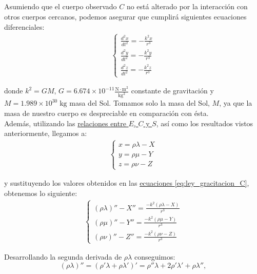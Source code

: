 \documentclass[11pt]{article}
\begin{document}
\subsection{}
Asumiendo que el cuerpo observado $C$ no está alterado por la interacción con otros cuerpos cercanos, podemos asegurar que cumplirá siguientes ecuaciones diferenciales:
\begin{align}
\left\{
\begin{array}{l}
	\frac{d^2x}{dt^2}=-\frac{k^2x}{r^3}\\
	\frac{d^2y}{dt^2}=-\frac{k^2y}{r^3}\\
	\frac{d^2z}{dt^2}=-\frac{k^2z}{r^3}
\end{array}
\right.
\label{eq:ley_gracitacion_C}
\end{align}

\noindent donde $k^2=GM$, $G=6.674\times10^{-11}\frac{\text{N}\cdot\text{m}^2}{\text{kg}^2}$ constante de gravitación y $M=1.989\times10^{30}\;\text{kg}$ masa del Sol. Tomamos solo la masa del Sol, $M$, ya que la masa de nuestro cuerpo es despreciable en comparación con ésta.\\

Además, utilizando las \hyperref[eq:terminologia]{relaciones entre $E$, $C$ y $S$}, así como los resultados vistos anteriormente, llegamos a:
\begin{align}
\left\{
\begin{array}{l}
	x=\rho\lambda-X\\
	y=\rho\mu-Y\\
	z=\rho\nu-Z
\end{array}
\right.
\label{eq:relacion_C_S_E}
\end{align}

\noindent y sustituyendo los valores obtenidos en las  \hyperref[eq:ley_gracitacion_C]{ecuaciones \ref{eq:ley_gracitacion_C}}, obtenemos lo siguiente:
\begin{align}
\left\{
\begin{array}{l}
	(\rho\lambda)'' - X'' = \frac{-k^2(\rho\lambda-X)}{r^3}\\
	(\rho\mu)'' - Y'' = \frac{-k^2(\rho\mu-Y)}{r^3}\\
	(\rho\nu)'' - Z'' = \frac{-k^2(\rho\nu-Z)}{r^3}
\end{array}
\right.
\label{eq:derivada_segunda}
\end{align}

Desarrollando la segunda derivada de $\rho\lambda$ conseguimos:
\[
(\rho\lambda)''=(\rho'\lambda+\rho\lambda')'=\rho''\lambda+2\rho'\lambda'+\rho\lambda'',
\]
\end{document}
